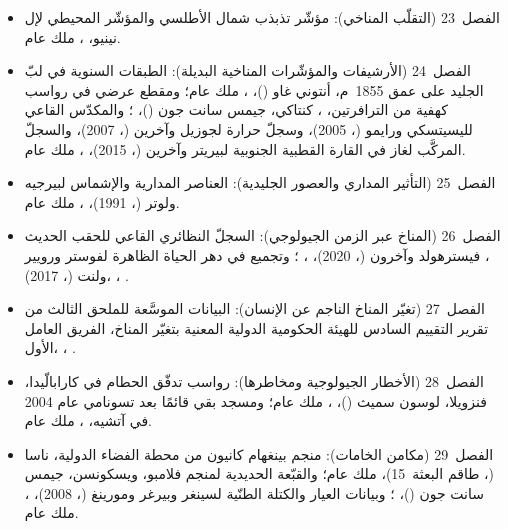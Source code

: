 \begin{itemize}
  \item الفصل~23 (التقلّب المناخي): مؤشّر تذبذب شمال الأطلسي والمؤشّر المحيطي لإل نينيو، ، ملك عام.
  \item الفصل~24 (الأرشيفات والمؤشّرات المناخية البديلة): الطبقات السنوية في لبّ الجليد  على عمق 1855~م، أنتوني غاو ()، ، ملك عام؛ ومقطع عرضي في رواسب كهفية من الترافرتين، ، كنتاكي، جيمس سانت جون ()، ؛ والمكدّس القاعي  لليسيتسكي ورايمو (، 2005)، وسجلّ حرارة  لجوزيل وآخرين (، 2007)، والسجلّ المركَّب لغاز  في القارة القطبية الجنوبية لبيريتر وآخرين (، 2015)، ، ملك عام.
  \item الفصل~25 (التأثير المداري والعصور الجليدية): العناصر المدارية والإشماس لبيرجيه ولوتر (، 1991)، ، ملك عام.
  \item الفصل~26 (المناخ عبر الزمن الجيولوجي): السجلّ النظائري القاعي للحقب الحديث ، فيسترهولد وآخرون (، 2020)، ، ؛ وتجميع  في دهر الحياة الظاهرة لفوستر ورويير ولنت (، 2017)، ، .
  \item الفصل~27 (تغيّر المناخ الناجم عن الإنسان): البيانات الموسَّعة للملحق الثالث من تقرير التقييم السادس للهيئة الحكومية الدولية المعنية بتغيّر المناخ، الفريق العامل الأول، ، .
  \item الفصل~28 (الأخطار الجيولوجية ومخاطرها): رواسب تدفّق الحطام في كارابالّيدا، فنزويلا، لوسون سميث ()، ، ملك عام؛ ومسجد بقي قائمًا بعد تسونامي عام 2004 في آتشيه، ، ملك عام.
  \item الفصل~29 (مكامن الخامات): منجم بينغهام كانيون من محطة الفضاء الدولية، ناسا (، طاقم البعثة~15)، ملك عام؛ والقبّعة الحديدية لمنجم فلامبو، ويسكونسن، جيمس سانت جون ()، ؛ وبيانات العيار والكتلة الطنّية لسينغر وبيرغر ومورينغ (، 2008)، ، ملك عام.

\end{itemize}
